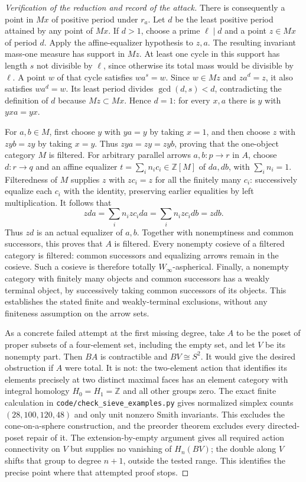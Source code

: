 \documentclass[11pt,a4paper]{article}
\theoremstyle{definition}
\theoremstyle{remark}
\begin{document}
\begin{proof}[Verification of the reduction and record of the attack]
There is consequently a point in $Mx$ of positive period under $r_a$. Let $d$ be the least positive period attained by any point of $Mx$. If $d>1$, choose a prime $\ell\mid d$ and a point $z\in Mx$ of period $d$. Apply the affine-equalizer hypothesis to $z,a$. The resulting invariant mass-one measure has support in $Mz$. At least one cycle in this support has length $s$ not divisible by $\ell$, since otherwise its total mass would be divisible by $\ell$. A point $w$ of that cycle satisfies $wa^s=w$. Since $w\in Mz$ and $za^d=z$, it also satisfies $wa^d=w$. Its least period divides $\gcd(d,s)<d$, contradicting the definition of $d$ because $Mz\subset Mx$. Hence $d=1$: for every $x,a$ there is $y$ with $yxa=yx$.

For $a,b\in M$, first choose $y$ with $ya=y$ by taking $x=1$, and then choose $z$ with $zyb=zy$ by taking $x=y$. Thus $zya=zy=zyb$, proving that the one-object category $M$ is filtered. For arbitrary parallel arrows $a,b:p\to r$ in $A$, choose $d:r\to q$ and an affine equalizer $t=\sum_i n_i c_i\in\mathbb Z[M]$ of $da,db$, with $\sum_i n_i=1$. Filteredness of $M$ supplies $z$ with $zc_i=z$ for all the finitely many $c_i$: successively equalize each $c_i$ with the identity, preserving earlier equalities by left multiplication. It follows that
\[
 zda=\sum_i n_i zc_i da=\sum_i n_i zc_i db=zdb.
\]
Thus $zd$ is an actual equalizer of $a,b$. Together with nonemptiness and common successors, this proves that $A$ is filtered. Every nonempty cosieve of a filtered category is filtered: common successors and equalizing arrows remain in the cosieve. Such a cosieve is therefore totally $W_\infty$-aspherical. Finally, a nonempty category with finitely many objects and common successors has a weakly terminal object, by successively taking common successors of its objects. This establishes the stated finite and weakly-terminal exclusions, without any finiteness assumption on the arrow sets.

As a concrete failed attempt at the first missing degree, take $A$ to be the poset of proper subsets of a four-element set, including the empty set, and let $V$ be its nonempty part. Then $BA$ is contractible and $BV\cong S^2$. It would give the desired obstruction if $A$ were total. It is not: the two-element action that identifies its elements precisely at two distinct maximal faces has an element category with integral homology $H_0=H_1=\mathbb Z$ and all other groups zero. The exact finite calculation in \texttt{code/check\_sieve\_examples.py} gives normalized simplex counts $(28,100,120,48)$ and only unit nonzero Smith invariants. This excludes the cone-on-a-sphere construction, and the preorder theorem excludes every directed-poset repair of it. The extension-by-empty argument gives all required action connectivity on $V$ but supplies no vanishing of $H_n(BV)$; the double along $V$ shifts that group to degree $n+1$, outside the tested range. This identifies the precise point where that attempted proof stops.
\end{proof}
\end{document}
